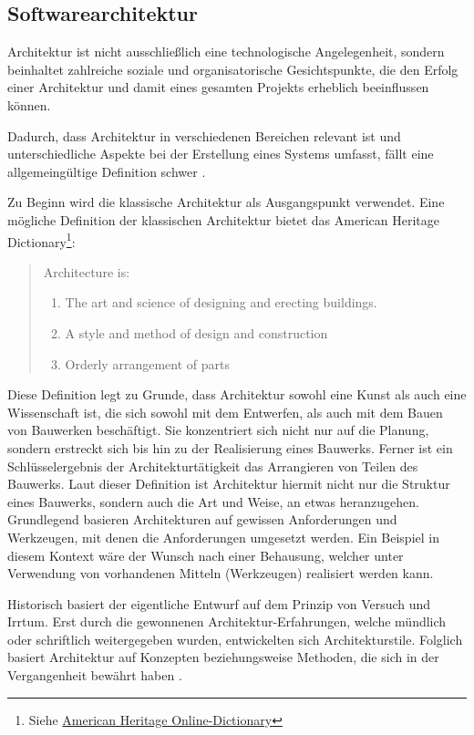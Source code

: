 \subsection{Softwarearchitektur}
\label{sec:2_Softwarearchitektur}

Architektur ist nicht ausschließlich eine technologische Angelegenheit, sondern beinhaltet zahlreiche soziale und organisatorische Gesichtspunkte, die den Erfolg einer Architektur und damit eines gesamten Projekts erheblich beeinflussen können.

Dadurch, dass Architektur in verschiedenen Bereichen relevant ist und unterschiedliche Aspekte bei der Erstellung eines Systems umfasst, fällt eine allgemeingültige Definition schwer \citereset \autocite[siehe][S. 8-11]{Vogel.2009}.

Zu Beginn wird die klassische Architektur als Ausgangspunkt verwendet. Eine mögliche Definition der klassischen Architektur bietet das \glqq American Heritage Dictionary\footnote{Siehe \href{http://ahdictionary.com/word/search.html?q=architecture&submit.x=39&submit.y=20}{American Heritage Online-Dictionary}}\grqq :
\begin{quote}
  Architecture is:
  \begin{enumerate}
    \item The art and science of designing and erecting buildings.
    \item A style and method of design and construction
    \item Orderly arrangement of parts
  \end{enumerate}
\end{quote}

Diese Definition legt zu Grunde, dass Architektur sowohl eine Kunst als auch eine Wissenschaft ist, die sich sowohl mit dem Entwerfen, als auch mit dem Bauen von Bauwerken beschäftigt. Sie konzentriert sich nicht nur auf die Planung, sondern erstreckt sich bis hin zu der Realisierung eines Bauwerks. Ferner ist ein Schlüsselergebnis der Architekturtätigkeit das Arrangieren von Teilen des Bauwerks. Laut dieser Definition ist Architektur hiermit nicht nur die Struktur eines Bauwerks, sondern auch die Art und Weise, an etwas heranzugehen. Grundlegend basieren Architekturen auf gewissen Anforderungen und Werkzeugen, mit denen die Anforderungen umgesetzt werden. Ein Beispiel in diesem Kontext wäre der Wunsch nach einer Behausung, welcher unter Verwendung von vorhandenen Mitteln (Werkzeugen) realisiert werden kann.

Historisch basiert der eigentliche Entwurf auf dem Prinzip von Versuch und Irrtum. Erst durch die gewonnenen Architektur-Erfahrungen, welche mündlich oder schriftlich weitergegeben wurden, entwickelten sich Architekturstile. Folglich basiert Architektur auf Konzepten beziehungsweise Methoden, die sich in der Vergangenheit bewährt haben \citereset \autocite[siehe][S. 41-68]{Vogel.2009}.

